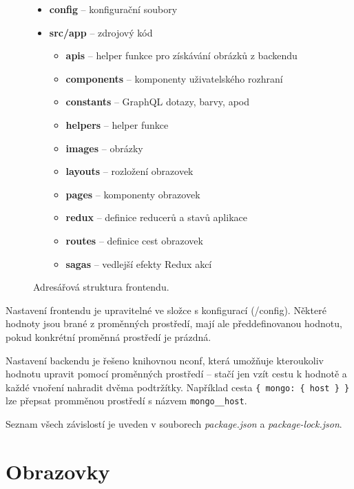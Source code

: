 \begin{figure}[!htb]
    \begin{itemize}
      \setlength\itemsep{.05em}
      \item \textbf{config} -- konfigurační soubory
      \item \textbf{src/app} -- zdrojový kód
      \begin{itemize}
        \setlength\itemsep{.05em}
        \item \textbf{apis} -- helper funkce pro získávání obrázků z backendu
        \item \textbf{components} -- komponenty uživatelského rozhraní
        \item \textbf{constants} -- GraphQL dotazy, barvy, apod
        \item \textbf{helpers} -- helper funkce
        \item \textbf{images} -- obrázky
        \item \textbf{layouts} -- rozložení obrazovek
        \item \textbf{pages} -- komponenty obrazovek
        \item \textbf{redux} -- definice reducerů a stavů aplikace
        \item \textbf{routes} -- definice cest obrazovek
        \item \textbf{sagas} -- vedlejší efekty Redux akcí
      \end{itemize}
    \end{itemize}
    \caption{Adresářová struktura frontendu.}
    \label{fig:structure_front}
  \end{figure}

\newpage

Nastavení frontendu je upravitelné ve složce s konfigurací (/config).
Některé hodnoty jsou brané z proměnných prostředí, mají ale předdefinovanou hodnotu, pokud
konkrétní proměnná prostředí je prázdná.

Nastavení backendu je řešeno knihovnou nconf, která umožňuje kteroukoliv hodnotu upravit
pomocí proměnných prostředí -- stačí jen vzít cestu k hodnotě a každé vnoření nahradit 
dvěma podtržítky.
\citep[viz][]{nconf}
Například cesta \texttt{\{ mongo: \{ host \} \}} lze přepsat promměnou prostředí s názvem \texttt{mongo\_\_host}.

Seznam všech závislostí je uveden v souborech \textit{package.json} a \textit{package-lock.json}.

\section{Obrazovky}

